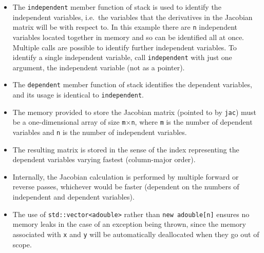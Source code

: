 \documentclass[a4,oneside]{book}
\def\codesize{\small}
\def\code#1{{\codesize\texttt{#1}}}
\begin{document}
\begin{itemize}
\item The \code{independent} member function of stack is used to
  identify the independent variables, i.e.\ the variables that the
  derivatives in the Jacobian matrix will be with respect to. In this
  example there are \code{n} independent variables located together in
  memory and so can be identified all at once. Multiple calls are
  possible to identify further independent variables.  To identify a
  single independent variable, call \code{independent} with just one
  argument, the independent variable (not as a pointer). 
\item The \code{dependent} member function of stack identifies the
  dependent variables, and its usage is identical to
  \code{independent}.
\item The memory provided to store the Jacobian matrix (pointed to by
  \code{jac}) must be a one-dimensional array of size
  \code{m}$\times$\code{n}, where \code{m} is the number of dependent
  variables and \code{n} is the number of independent variables.
\item The resulting matrix is stored in the sense of the index
  representing the dependent variables varying fastest (column-major
  order).
\item Internally, the Jacobian calculation is performed by multiple
  forward or reverse passes, whichever would be faster (dependent on
  the numbers of independent and dependent variables).
\item The use of \code{std::vector<adouble>} rather than \code{new
  adouble[n]} ensures no memory leaks in the case of an exception being
  thrown, since the memory associated with \code{x} and \code{y} will
  be automatically deallocated when they go out of scope.
\end{itemize}%
\end{document}
